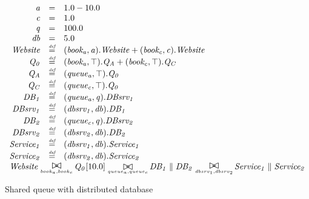 \begin{figure}
	\caption{Shared queue with distributed database}
	\label{figure:queuedd}
	\centering
	\begin{displaymath}
	\begin{array}{rcl}
	\mathit{a} & = & 1.0-10.0\\
	\mathit{c} & = & 1.0\\
	\mathit{q} & = & 100.0\\
	\mathit{db} & = & 5.0\\
	[0.0ex]		\mathit{Website} & \rmdef & (\mathit{book_a},\mathit{a}).\mathit{Website}+(\mathit{book_c},\mathit{c}).\mathit{Website}\\
	\mathit{Q_0} & \rmdef & (\mathit{book_a},\top).\mathit{Q_A}+(\mathit{book_c},\top).\mathit{Q_C}\\
	\mathit{Q_A} & \rmdef & (\mathit{queue_a},\top).\mathit{Q_0}\\
	\mathit{Q_C} & \rmdef & (\mathit{queue_c},\top).\mathit{Q_0}\\
	\mathit{DB_1} & \rmdef & (\mathit{queue_a},\mathit{q}).\mathit{DBsrv_1}\\
	\mathit{DBsrv_1} & \rmdef & (\mathit{dbsrv_1},\mathit{db}).\mathit{DB_1}\\
	\mathit{DB_2} & \rmdef & (\mathit{queue_c},\mathit{q}).\mathit{DBsrv_2}\\
	\mathit{DBsrv_2} & \rmdef & (\mathit{dbsrv_2},\mathit{db}).\mathit{DB_2}\\
	\mathit{Service_1} & \rmdef & (\mathit{dbsrv_1},\mathit{db}).\mathit{Service_1}\\
	\mathit{Service_2} & \rmdef & (\mathit{dbsrv_2},\mathit{db}).\mathit{Service_2}\\
	[0.0ex]		\multicolumn{3}{l}{\mathit{Website}\sync{book_a,book_c}\mathit{Q_0}[10.0]\sync{queue_a,queue_c}\mathit{DB_1}\parallel\mathit{DB_2}\sync{dbsrv_1,dbsrv_2}\mathit{Service_1}\parallel\mathit{Service_2}}\\
	[0.0ex]	\end{array}
	\end{displaymath}
\end{figure}